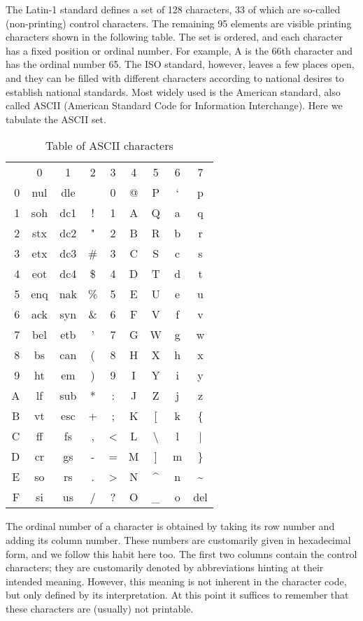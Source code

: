 The Latin-1 standard defines a set of 128 characters, 33 of which are so-called (non-printing)
control characters. The remaining 95 elements are visible printing characters shown in the following
table. The set is ordered, and each character has a fixed position or ordinal number. For example,
A is the 66th character and has the ordinal number 65. The ISO standard, however, leaves a few
places open, and they can be filled with different characters according to national desires to
establish national standards. Most widely used is the American standard, also called ASCII
(American Standard Code for Information Interchange). Here we tabulate the ASCII set.
\begin{table}[h!]
  \centering
  \begin{tabular}{r c c c c c c c c}
      &  0  &  1  &  2 & 3 & 4 &              5 & 6 &  7 \\
    0 & nul & dle &    & 0 & @ &              P & ` &  p \\
    1 & soh & dc1 &  ! & 1 & A &              Q & a &  q \\
    2 & stx & dc2 &  " & 2 & B &              R & b &  r \\
    3 & etx & dc3 & \# & 3 & C &              S & c &  s \\
    4 & eot & dc4 & \$ & 4 & D &              T & d &  t \\
    5 & enq & nak & \% & 5 & E &              U & e &  u \\
    6 & ack & syn & \& & 6 & F &              V & f &  v \\
    7 & bel & etb &  ' & 7 & G &              W & g &  w \\
    8 & bs  & can &  ( & 8 & H &              X & h &  x \\
    9 & ht  & em  &  ) & 9 & I &              Y & i &  y \\
    A & lf  & sub &  * & : & J &              Z & j &  z \\
    B & vt  & esc &  + & ; & K &              [ & k & \{ \\
    C & ff  & fs  &  , & < & L & \textbackslash & l &  | \\
    D & cr  & gs  &  - & = & M &              ] & m & \} \\
    E & so  & rs  &  . & > & N &           \^{} & n & \~{} \\
    F & si  & us  &  / & ? & O &             \_ & o & del
  \end{tabular}
  \caption{Table of ASCII characters}
\end{table}
The ordinal number of a character is obtained by taking its row number and adding its column number. These
numbers are customarily given in hexadecimal form, and we follow this habit here too. The first two
columns contain the control characters; they are customarily denoted by abbreviations hinting at
their intended meaning. However, this meaning is not inherent in the character code, but only
defined by its interpretation. At this point it suffices to remember that these characters are (usually)
not printable.


